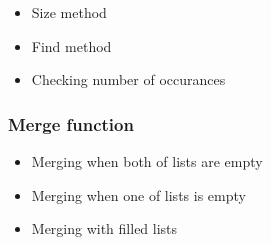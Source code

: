 \documentclass{article}
\begin{document}
\begin{itemize}
    \item Size method
    \item Find method
    \item Checking number of occurances
\end{itemize}

\subsubsection*{Merge function}

\begin{itemize}
    \item Merging when both of lists are empty
    \item Merging when one of lists is empty
    \item Merging with filled lists
\end{itemize}
\end{document}
